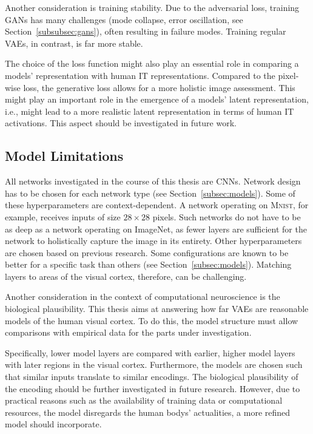 Another consideration is training stability.
Due to the adversarial loss, training \acp{GAN} has many challenges (mode collapse, error oscillation, see Section~\ref{subsubsec:gans}), often resulting in failure modes.
Training regular \acp{VAE}, in contrast, is far more stable.

The choice of the loss function might also play an essential role in comparing a models' representation with human \ac{IT} representations.
Compared to the pixel-wise loss, the generative loss allows for a more holistic image assessment.
This might play an important role in the emergence of a models' latent representation, i.e., might lead to a more realistic latent representation in terms of human IT activations.
This aspect should be investigated in future work.

\subsection{Model Limitations}\label{subsec:model-limitations}
All networks investigated in the course of this thesis are \acp{CNN}.
Network design has to be chosen for each network type (see Section~\ref{subsec:models}).
Some of these hyperparameters are context-dependent.
A network operating on \textsc{Mnist}, for example, receives inputs of size $28\times 28$ pixels.
Such networks do not have to be as deep as a network operating on ImageNet, as fewer layers are sufficient for the network to holistically capture the image in its entirety.
Other hyperparameters are chosen based on previous research.
Some configurations are known to be better for a specific task than others (see Section~\ref{subsec:models}).
Matching layers to areas of the visual cortex, therefore, can be challenging.

Another consideration in the context of computational neuroscience is the biological plausibility.
This thesis aims at answering how far \acp{VAE} are reasonable models of the human visual cortex.
To do this, the model structure must allow comparisons with empirical data for the parts under investigation.

Specifically, lower model layers are compared with earlier, higher model layers with later regions in the visual cortex.
Furthermore, the models are chosen such that similar inputs translate to similar encodings.
The biological plausibility of the encoding should be further investigated in future research.
However, due to practical reasons such as the availability of training data or computational resources, the model disregards the human bodys' actualities, a more refined model should incorporate.


